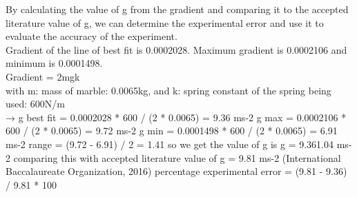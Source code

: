 By calculating the value of g from the gradient and comparing it to the accepted literature value of g, we can determine the experimental error and use it to evaluate the accuracy of the experiment. \\
Gradient of the line of best fit is 0.0002028. Maximum gradient is 0.0002106 and minimum is 0.0001498. \\
Gradient = 2mgk \\
with m: mass of marble: 0.0065kg, and k: spring constant of the spring being used: 600N/m \\
→ g best fit = 0.0002028 * 600 / (2 * 0.0065) = 9.36 ms-2
g max = 0.0002106 * 600 / (2 * 0.0065) = 9.72 ms-2
g min = 0.0001498 * 600 / (2 * 0.0065) = 6.91 ms-2
range = (9.72 - 6.91) / 2 = 1.41
so we get the value of g is g = 9.361.04 ms-2
comparing this with accepted literature value of g = 9.81 ms-2 (International Baccalaureate Organization, 2016)
percentage experimental error = (9.81 - 9.36) / 9.81 * 100%
